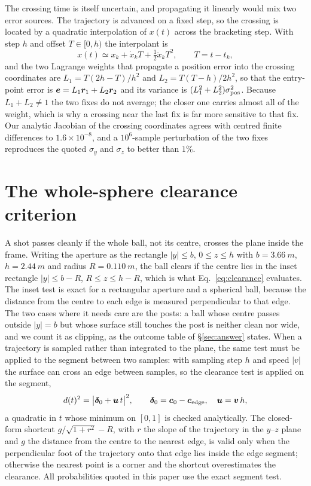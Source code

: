 The crossing time is itself uncertain, and propagating it linearly would mix two
error sources. The trajectory is advanced on a fixed step, so the crossing is
located by a quadratic interpolation of $x(t)$ across the bracketing step. With
step $h$ and offset $T\in[0,h)$ the interpolant is
\begin{equation}
  x(t)\simeq x_k+\dot x_kT+\tfrac12\ddot x_kT^2,\qquad T=t-t_k,
\end{equation}
and the two Lagrange weights that propagate a position error into the crossing
coordinates are $L_1=T(2h-T)/h^2$ and $L_2=T(T-h)/2h^2$, so that the entry-point
error is $\bm{e}=L_1\bm{r}_1+L_2\bm{r}_2$ and its variance is
$(L_1^2+L_2^2)\sigma_{\rm pos}^2$. Because $L_1+L_2\ne1$ the two fixes do not
average; the closer one carries almost all of the weight, which is why a crossing
near the last fix is far more sensitive to that fix. Our analytic Jacobian of the
crossing coordinates agrees with centred finite differences to
$1.6\times10^{-8}$, and a $10^6$-sample perturbation of the two fixes reproduces
the quoted $\sigma_y$ and $\sigma_z$ to better than $1\%$.

\section{The whole-sphere clearance criterion}
\label{app:sphere}

A shot passes cleanly if the whole ball, not its centre, crosses the plane inside
the frame. Writing the aperture as the rectangle $|y|\le b$, $0\le z\le h$ with
$b=\SI{3.66}{m}$, $h=\SI{2.44}{m}$ and radius $R=\SI{0.110}{m}$, the ball clears
if the centre lies in the inset rectangle $|y|\le b-R$, $R\le z\le h-R$, which is
what Eq.~\eqref{eq:clearance} evaluates. The inset test is exact for a rectangular
aperture and a spherical ball, because the distance from the centre to each edge
is measured perpendicular to that edge. The two cases where it needs care are
the posts: a ball whose centre passes outside $|y|=b$ but whose surface still
touches the post is neither clean nor wide, and we count it as clipping, as the
outcome table of \S\ref{sec:answer} states. When a trajectory is sampled rather
than integrated to the plane, the same test must be applied to the segment
between two samples: with sampling step $h$ and speed $|v|$ the surface can cross
an edge between samples, so the clearance test is applied on the segment,
\begin{equation}
  d(t)^2=\big|\bm{\delta}_0+\bm{u}\,t\big|^2,\qquad
  \bm{\delta}_0=\bm{c}_0-\bm{c}_{\rm edge},\quad \bm{u}=\bm{v}\,h,
\end{equation}
a quadratic in $t$ whose minimum on $[0,1]$ is checked analytically. The
closed-form shortcut $g/\sqrt{1+r^2}-R$, with $r$ the slope of the trajectory in
the $y$--$z$ plane and $g$ the distance from the centre to the nearest edge, is
valid only when the perpendicular foot of the trajectory onto that edge lies
inside the edge segment; otherwise the nearest point is a corner and the
shortcut overestimates the clearance. All probabilities quoted in this paper use
the exact segment test.
